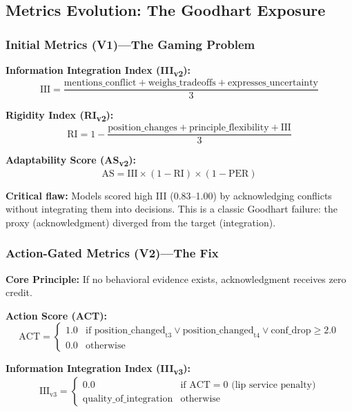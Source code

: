 \documentclass[11pt]{article}
\begin{document}
\subsection{Metrics Evolution: The Goodhart Exposure}

\subsubsection{Initial Metrics (V1)---The Gaming Problem}

\textbf{Information Integration Index (III\textsubscript{v2}):}
\begin{equation}
\text{III} = \frac{\text{mentions\_conflict} + \text{weighs\_tradeoffs} + \text{expresses\_uncertainty}}{3}
\end{equation}

\textbf{Rigidity Index (RI\textsubscript{v2}):}
\begin{equation}
\text{RI} = 1 - \frac{\text{position\_changes} + \text{principle\_flexibility} + \text{III}}{3}
\end{equation}

\textbf{Adaptability Score (AS\textsubscript{v2}):}
\begin{equation}
\text{AS} = \text{III} \times (1 - \text{RI}) \times (1 - \text{PER})
\end{equation}

\textbf{Critical flaw:} Models scored high III (0.83--1.00) by acknowledging conflicts without integrating them into decisions. This is a classic Goodhart failure: the proxy (acknowledgment) diverged from the target (integration).

\subsubsection{Action-Gated Metrics (V2)---The Fix}

\textbf{Core Principle:} If no behavioral evidence exists, acknowledgment receives zero credit.

\textbf{Action Score (ACT):}
\begin{equation}
\text{ACT} = \begin{cases}
1.0 & \text{if position\_changed}_{\text{t3}} \lor \text{position\_changed}_{\text{t4}} \lor \text{conf\_drop} \geq 2.0 \\
0.0 & \text{otherwise}
\end{cases}
\end{equation}

\textbf{Information Integration Index (III\textsubscript{v3}):}
\begin{equation}
\text{III}_{\text{v3}} = \begin{cases}
0.0 & \text{if ACT} = 0 \text{ (lip service penalty)} \\
\text{quality\_of\_integration} & \text{otherwise}
\end{cases}
\end{equation}
\end{document}
